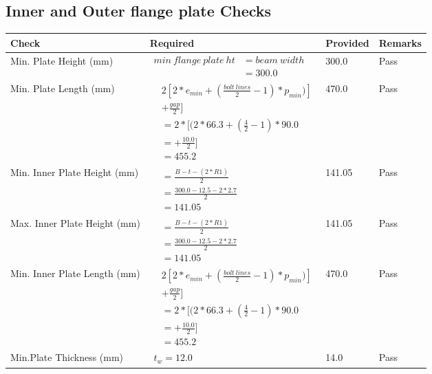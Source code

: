 \documentclass{article}%
\begin{document}
%
\newpage%
\subsection{Inner and Outer flange plate Checks}%
\label{subsec:InnerandOuterflangeplateChecks}%
\renewcommand{\arraystretch}{1.2}%
\begin{longtable}{|p{4cm}|p{6cm}|p{5.5cm}|p{1.5cm}|}%
\hline%
\rowcolor{OsdagGreen}%
Check&Required&Provided&Remarks\\%
\hline%
\endhead%
\hline%
Min. Plate Height (mm)&$\begin{aligned}min~flange~plate~ht &= beam~width\\ &=300.0\end{aligned}$&300.0&Pass\\%
\hline%
Min. Plate Length (mm)&$\begin{aligned} & 2[2*e_{min} + ({\frac{bolt~lines}{2}}-1) * p_{min})]\\ & +\frac{gap}{2}]\\ &=2*[(2*66.3 + (\frac{4}{2}-1) * 90.0\\ &= + \frac{10.0}{2}]\\ &=455.2\end{aligned}$&470.0&Pass\\%
\hline%
Min. Inner Plate Height (mm)&$\begin{aligned}&= \frac{B -t- (2*R1)}{2}\\ &=\frac{300.0 -12.5 - 2*2.7}{2}\\ &=141.05\end{aligned}$&141.05&Pass\\%
\hline%
Max. Inner Plate Height (mm)&$\begin{aligned}&= \frac{B -t- (2*R1)}{2}\\ &=\frac{300.0 -12.5 - 2*2.7}{2}\\ &=141.05\end{aligned}$&141.05&Pass\\%
\hline%
Min. Inner Plate Length (mm)&$\begin{aligned} & 2[2*e_{min} + ({\frac{bolt~lines}{2}}-1) * p_{min})]\\ & +\frac{gap}{2}]\\ &=2*[(2*66.3 + (\frac{4}{2}-1) * 90.0\\ &= + \frac{10.0}{2}]\\ &=455.2\end{aligned}$&470.0&Pass\\%
\hline%
Min.Plate Thickness (mm)&$\begin{aligned} t_w=12.0\end{aligned}$&14.0&Pass\\%
\hline%
\end{longtable}
\end{document}
